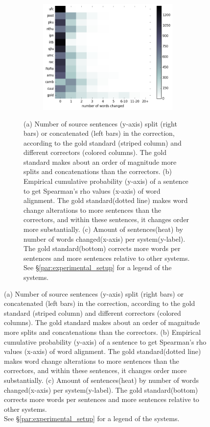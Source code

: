 \documentclass[letter,11pt]{article}
\newcommand{\com}[1]{}
\begin{document}
\begin{figure}[tbp]
{\begin{figure}[tbp]
  		\begin{subfigure}[]{0.4\textwidth}
  			\caption{\label{fig:words_changed}}
  			\includegraphics[width = \textwidth]{words_differences_heat}
  			\com{\caption{Amount of sentences(heat) by number of words changed(x-axis) per system(y-label). The gold standard(bottom) corrects more words per sentences and more sentences relative to other systems.\label{fig:words_changed}}}
  		\end{subfigure}
  		\caption{(a) Number of source sentences (y-axis) split 
  			(right bars) or concatenated (left bars) in the correction, according to the gold standard (striped column) and different correctors (colored columns). The gold standard makes about an order of magnitude more splits and concatenations than the correctors.
  			(b) Empirical cumulative probability (y-axis) of a sentence to get Spearman's rho values (x-axis) of word alignment. The gold standard(dotted line) makes word change alterations to more sentences than the correctors, and within these sentences, it changes order more substantially.
  			(c) Amount of sentences(heat) by number of words changed(x-axis) per system(y-label). The gold standard(bottom) corrects more words per sentences and more sentences relative to other systems.\\
  			See \S\ref{par:experimental_setup} for a legend
  			of the systems.\label{fig:over-conservatism}}
  		\com{\caption{	See \S\ref{par:experimental_setup} for a legend
  				of the systems. \label{fig:over-conservatism}}}
  	\end{figure}}
\end{figure}
\end{document}
